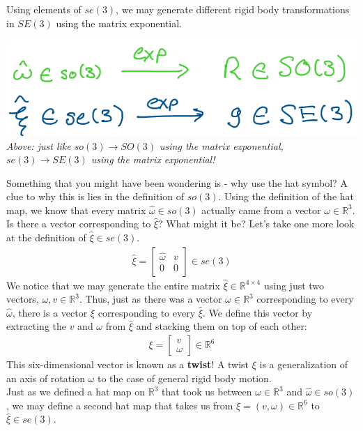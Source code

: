 \documentclass[oneside]{book}
\begin{document}
Using elements of $se(3)$, we may generate different rigid body transformations in $SE(3)$ using the matrix exponential.
\begin{center}
    \includegraphics[scale=0.5]{images/twist_map.png}\\
    \textit{Above: just like $so(3) \to SO(3)$ using the matrix exponential, $se(3) \to SE(3)$ using the matrix exponential!}
\end{center}
Something that you might have been wondering is - why use the hat symbol? A clue to why this is lies in the definition of $so(3)$. Using the definition of the hat map, we know that every matrix $\hat\omega \in so(3)$ actually came from a vector $\omega \in\mathbb{R}^3$.
Is there a vector corresponding to $\hat\xi$? What might it be? Let's take one more look at the definition of $\hat\xi \in se(3)$.
\begin{align}
    \hat\xi = 
     \begin{bmatrix}
        \hat\omega & v\\
        0 & 0
    \end{bmatrix} \in se(3)
\end{align}
We notice that we may generate the entire matrix $\hat\xi \in \mathbb{R}^{4\times 4}$ using just two vectors, $\omega, v \in \mathbb{R}^3$. Thus, just as there was a vector $\omega \in \mathbb{R}^3$ corresponding to every $\hat{\omega}$, there is a vector $\xi$ corresponding to every $\hat\xi$. We define this vector by extracting the $v$ and $\omega$ from $\hat\xi$ and stacking them on top of each other:
\begin{align}
    \xi = 
    \begin{bmatrix}
        v\\
        \omega
    \end{bmatrix} \in \mathbb{R}^6
\end{align}
This six-dimensional vector is known as a \textbf{twist}! A twist $\xi$ is a generalization of an axis of rotation $\omega$ to the case of general rigid body motion.\\
Just as we defined a hat map on $\mathbb{R}^3$ that took us between $\omega \in \mathbb{R}^3$ and $\hat\omega \in so(3)$, we may define a second hat map that takes us from $\xi = (v, \omega) \in \mathbb{R}^6$ to $\hat\xi \in se(3)$.
\end{document}
